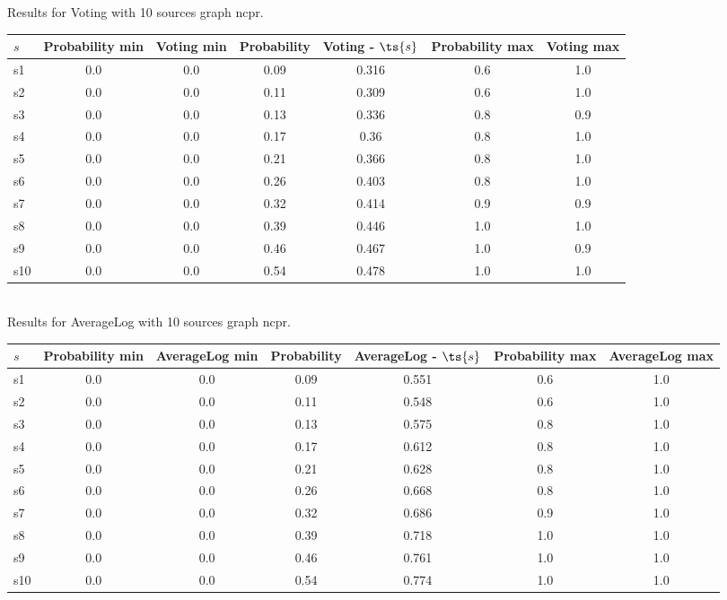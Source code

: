 \documentclass{article}
\begin{document}
\noindent Results for Voting with 10 sources graph ncpr.

\noindent\begin{tabular}{|l|c|c|c|c|c|c|}
\hline
$s$& Probability min & Voting min & Probability & Voting - $\ts{s}$ & Probability max & Voting max\\
\hline
s1 &0.0 & 0.0 & 0.09 & 0.316 & 0.6 & 1.0\\
\hline
s2 &0.0 & 0.0 & 0.11 & 0.309 & 0.6 & 1.0\\
\hline
s3 &0.0 & 0.0 & 0.13 & 0.336 & 0.8 & 0.9\\
\hline
s4 &0.0 & 0.0 & 0.17 & 0.36 & 0.8 & 1.0\\
\hline
s5 &0.0 & 0.0 & 0.21 & 0.366 & 0.8 & 1.0\\
\hline
s6 &0.0 & 0.0 & 0.26 & 0.403 & 0.8 & 1.0\\
\hline
s7 &0.0 & 0.0 & 0.32 & 0.414 & 0.9 & 0.9\\
\hline
s8 &0.0 & 0.0 & 0.39 & 0.446 & 1.0 & 1.0\\
\hline
s9 &0.0 & 0.0 & 0.46 & 0.467 & 1.0 & 0.9\\
\hline
s10 &0.0 & 0.0 & 0.54 & 0.478 & 1.0 & 1.0\\
\hline
\end{tabular}\\

\noindent Results for AverageLog with 10 sources graph ncpr.

\noindent\begin{tabular}{|l|c|c|c|c|c|c|}
\hline
$s$& Probability min & AverageLog min & Probability & AverageLog - $\ts{s}$ & Probability max & AverageLog max\\
\hline
s1 &0.0 & 0.0 & 0.09 & 0.551 & 0.6 & 1.0\\
\hline
s2 &0.0 & 0.0 & 0.11 & 0.548 & 0.6 & 1.0\\
\hline
s3 &0.0 & 0.0 & 0.13 & 0.575 & 0.8 & 1.0\\
\hline
s4 &0.0 & 0.0 & 0.17 & 0.612 & 0.8 & 1.0\\
\hline
s5 &0.0 & 0.0 & 0.21 & 0.628 & 0.8 & 1.0\\
\hline
s6 &0.0 & 0.0 & 0.26 & 0.668 & 0.8 & 1.0\\
\hline
s7 &0.0 & 0.0 & 0.32 & 0.686 & 0.9 & 1.0\\
\hline
s8 &0.0 & 0.0 & 0.39 & 0.718 & 1.0 & 1.0\\
\hline
s9 &0.0 & 0.0 & 0.46 & 0.761 & 1.0 & 1.0\\
\hline
s10 &0.0 & 0.0 & 0.54 & 0.774 & 1.0 & 1.0\\
\hline
\end{tabular}\\
\end{document}
